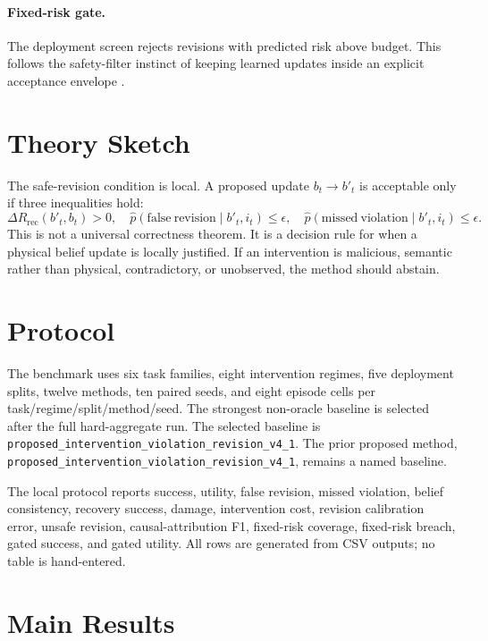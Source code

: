 \documentclass{article}
\begin{document}
\paragraph{Fixed-risk gate.}
The deployment screen rejects revisions with predicted risk above budget. This follows the safety-filter instinct of keeping learned updates inside an explicit acceptance envelope \citep{fisac2018safety,garcia2015safe}.

\section{Theory Sketch}
The safe-revision condition is local. A proposed update $b_t \rightarrow b'_t$ is acceptable only if three inequalities hold:
\[
\Delta R_\mathrm{rec}(b'_t,b_t)>0,\quad
\hat p(\mathrm{false\ revision}\mid b'_t,i_t)\le \epsilon,\quad
\hat p(\mathrm{missed\ violation}\mid b'_t,i_t)\le \epsilon.
\]
This is not a universal correctness theorem. It is a decision rule for when a physical belief update is locally justified. If an intervention is malicious, semantic rather than physical, contradictory, or unobserved, the method should abstain.

\section{Protocol}
The benchmark uses six task families, eight intervention regimes, five deployment splits, twelve methods, ten paired seeds, and eight episode cells per task/regime/split/method/seed. The strongest non-oracle baseline is selected after the full hard-aggregate run. The selected baseline is \texttt{proposed\_intervention\_violation\_revision\_v4\_1}. The prior proposed method, \texttt{proposed\_intervention\_violation\_revision\_v4\_1}, remains a named baseline.

The local protocol reports success, utility, false revision, missed violation, belief consistency, recovery success, damage, intervention cost, revision calibration error, unsafe revision, causal-attribution F1, fixed-risk coverage, fixed-risk breach, gated success, and gated utility. All rows are generated from CSV outputs; no table is hand-entered.

\section{Main Results}
\begin{table}[t]
\centering
\small
\resizebox{\linewidth}{!}{}
\caption{Hard aggregate results. Higher success, utility, belief consistency, recovery, and causal attribution are better; lower false revision, missed violation, damage, cost, calibration error, and unsafe revision are better.}
\end{table}
\end{document}
